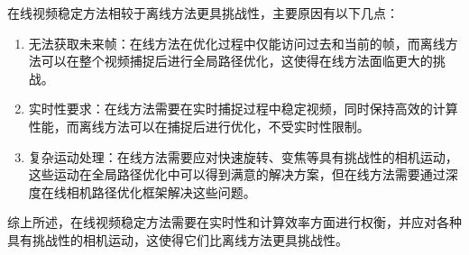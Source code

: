 在线视频稳定方法相较于离线方法更具挑战性，主要原因有以下几点：

\begin{enumerate}
	\item 无法获取未来帧：在线方法在优化过程中仅能访问过去和当前的帧，而离线方法可以在整个视频捕捉后进行全局路径优化，这使得在线方法面临更大的挑战。
	\item 实时性要求：在线方法需要在实时捕捉过程中稳定视频，同时保持高效的计算性能，而离线方法可以在捕捉后进行优化，不受实时性限制。
	\item 复杂运动处理：在线方法需要应对快速旋转、变焦等具有挑战性的相机运动，这些运动在全局路径优化中可以得到满意的解决方案，但在线方法需要通过深度在线相机路径优化框架解决这些问题。
\end{enumerate}

综上所述，在线视频稳定方法需要在实时性和计算效率方面进行权衡，并应对各种具有挑战性的相机运动，这使得它们比离线方法更具挑战性。